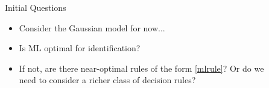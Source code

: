 \documentclass[final]{beamer}
\newlength{\sepwid}
\newlength{\onecolwid}
\begin{document}
\begin{frame}[t]
\begin{columns}[t]
\begin{column}{\onecolwid}
\begin{block}{Initial Questions}
\begin{itemize}
\item Consider the Gaussian model for now...
\item Is ML optimal for identification?
\item If not, are there near-optimal rules of the form \eqref{mlrule}?
Or do we need to consider a richer class of decision rules?
\end{itemize}
\end{block}







\end{column} %

\begin{column}{\sepwid}\end{column} %


\begin{column}{\onecolwid}


\end{column}
\end{columns}
\end{frame}
\end{document}
